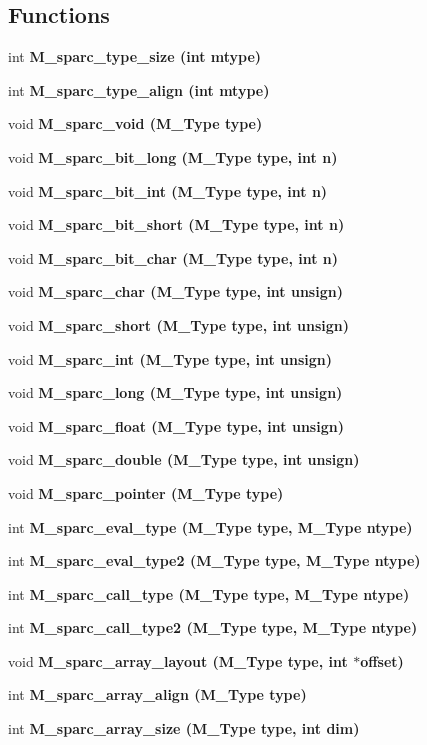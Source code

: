 \subsection*{Functions}
\begin{CompactItemize}
\item 
int \bf{M\_\-sparc\_\-type\_\-size} (int mtype)
\item 
int \bf{M\_\-sparc\_\-type\_\-align} (int mtype)
\item 
void \bf{M\_\-sparc\_\-void} (\bf{M\_\-Type} type)
\item 
void \bf{M\_\-sparc\_\-bit\_\-long} (\bf{M\_\-Type} type, int n)
\item 
void \bf{M\_\-sparc\_\-bit\_\-int} (\bf{M\_\-Type} type, int n)
\item 
void \bf{M\_\-sparc\_\-bit\_\-short} (\bf{M\_\-Type} type, int n)
\item 
void \bf{M\_\-sparc\_\-bit\_\-char} (\bf{M\_\-Type} type, int n)
\item 
void \bf{M\_\-sparc\_\-char} (\bf{M\_\-Type} type, int unsign)
\item 
void \bf{M\_\-sparc\_\-short} (\bf{M\_\-Type} type, int unsign)
\item 
void \bf{M\_\-sparc\_\-int} (\bf{M\_\-Type} type, int unsign)
\item 
void \bf{M\_\-sparc\_\-long} (\bf{M\_\-Type} type, int unsign)
\item 
void \bf{M\_\-sparc\_\-float} (\bf{M\_\-Type} type, int unsign)
\item 
void \bf{M\_\-sparc\_\-double} (\bf{M\_\-Type} type, int unsign)
\item 
void \bf{M\_\-sparc\_\-pointer} (\bf{M\_\-Type} type)
\item 
int \bf{M\_\-sparc\_\-eval\_\-type} (\bf{M\_\-Type} type, \bf{M\_\-Type} ntype)
\item 
int \bf{M\_\-sparc\_\-eval\_\-type2} (\bf{M\_\-Type} type, \bf{M\_\-Type} ntype)
\item 
int \bf{M\_\-sparc\_\-call\_\-type} (\bf{M\_\-Type} type, \bf{M\_\-Type} ntype)
\item 
int \bf{M\_\-sparc\_\-call\_\-type2} (\bf{M\_\-Type} type, \bf{M\_\-Type} ntype)
\item 
void \bf{M\_\-sparc\_\-array\_\-layout} (\bf{M\_\-Type} type, int $\ast$offset)
\item 
int \bf{M\_\-sparc\_\-array\_\-align} (\bf{M\_\-Type} type)
\item 
int \bf{M\_\-sparc\_\-array\_\-size} (\bf{M\_\-Type} type, int dim)

\end{CompactItemize}
